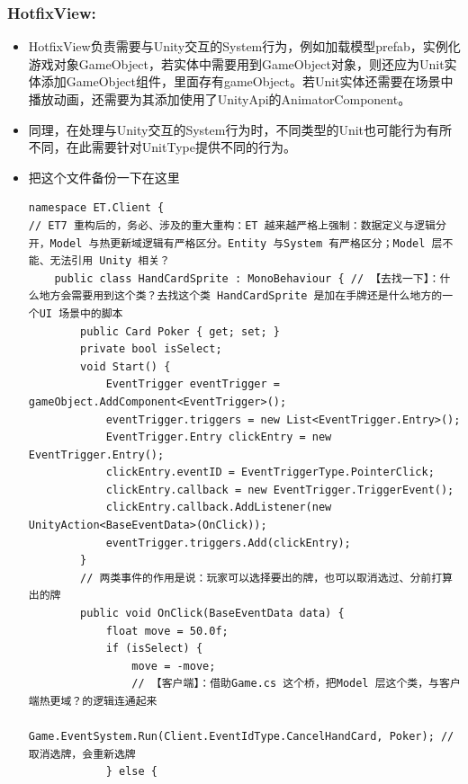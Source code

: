 \documentclass[9pt, b5paper]{article}
\begin{document}
\subsubsection{HotfixView:}
\label{sec:orgf4a6569}
\begin{itemize}
\item HotfixView负责需要与Unity交互的System行为，例如加载模型prefab，实例化游戏对象GameObject，若实体中需要用到GameObject对象，则还应为Unit实体添加GameObject组件，里面存有gameObject。若Unit实体还需要在场景中播放动画，还需要为其添加使用了UnityApi的AnimatorComponent。
\item 同理，在处理与Unity交互的System行为时，不同类型的Unit也可能行为有所不同，在此需要针对UnitType提供不同的行为。
\item 把这个文件备份一下在这里
\begin{verbatim}
namespace ET.Client {
// ET7 重构后的，务必、涉及的重大重构：ET 越来越严格上强制：数据定义与逻辑分开，Model 与热更新域逻辑有严格区分。Entity 与System 有严格区分；Model 层不能、无法引用 Unity 相关？
    public class HandCardSprite : MonoBehaviour { // 【去找一下】：什么地方会需要用到这个类？去找这个类 HandCardSprite 是加在手牌还是什么地方的一个UI 场景中的脚本
        public Card Poker { get; set; }
        private bool isSelect;
        void Start() {
            EventTrigger eventTrigger = gameObject.AddComponent<EventTrigger>();
            eventTrigger.triggers = new List<EventTrigger.Entry>();
            EventTrigger.Entry clickEntry = new EventTrigger.Entry();
            clickEntry.eventID = EventTriggerType.PointerClick;
            clickEntry.callback = new EventTrigger.TriggerEvent();
            clickEntry.callback.AddListener(new UnityAction<BaseEventData>(OnClick));
            eventTrigger.triggers.Add(clickEntry);
        }
        // 两类事件的作用是说：玩家可以选择要出的牌，也可以取消选过、分前打算出的牌
        public void OnClick(BaseEventData data) {
            float move = 50.0f;
            if (isSelect) {
                move = -move;
                // 【客户端】：借助Game.cs 这个桥，把Model 层这个类，与客户端热更域？的逻辑连通起来
                Game.EventSystem.Run(Client.EventIdType.CancelHandCard, Poker); // 取消选牌，会重新选牌
            } else {
 

\end{verbatim}
\end{itemize}
\end{document}

